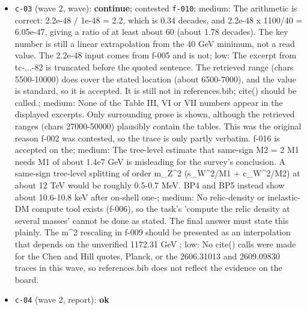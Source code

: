 \documentclass[11pt,a4paper]{article}
\begin{document}
\begin{itemize}
  \item \texttt{c-03} (wave 2, wave): \textbf{continue}; contested \texttt{f-010}; medium: The arithmetic is correct: 2.2e-48 / 1e-48 = 2.2, which is 0.34 decades, and 2.2e-48 x 1100/40 = 6.05e-47, giving a ratio of at least about 60 (about 1.78 decades). The key number is still a linear extrapolation from the 40 GeV minimum, not a read value. The 2.2e-48 input comes from f-005 and is not; low: The excerpt from tc-...-82 is truncated before the quoted sentence. The retrieved range (chars 5500-10000) does cover the stated location (about 6500-7000), and the value is standard, so it is accepted. It is still not in references.bib; cite() should be called.; medium: None of the Table III, VI or VII numbers appear in the displayed excerpts. Only surrounding prose is shown, although the retrieved ranges (chars 27000-50000) plausibly contain the tables. This was the original reason f-002 was contested, so the trace is only partly verbatim. f-016 is accepted on the; medium: The tree-level estimate that same-sign M2 = 2 M1 needs M1 of about 1.4e7 GeV is misleading for the survey's conclusion. A same-sign tree-level splitting of order m\_Z\textasciicircum{}2 (s\_W\textasciicircum{}2/M1 + c\_W\textasciicircum{}2/M2) at about 12 TeV would be roughly 0.5-0.7 MeV. BP4 and BP5 instead show about 10.6-10.8 keV after on-shell one-; medium: No relic-density or inelastic-DM compute tool exists (f-006), so the task's 'compute the relic density at several masses' cannot be done as stated. The final answer must state this plainly. The m\textasciicircum{}2 rescaling in f-009 should be presented as an interpolation that depends on the unverified 1172.31 GeV ; low: No cite() calls were made for the Chen and Hill quotes, Planck, or the 2606.31013 and 2609.09830 traces in this wave, so references.bib does not reflect the evidence on the board.
  \item \texttt{c-04} (wave 2, report): \textbf{ok}
\end{itemize}
\end{document}
